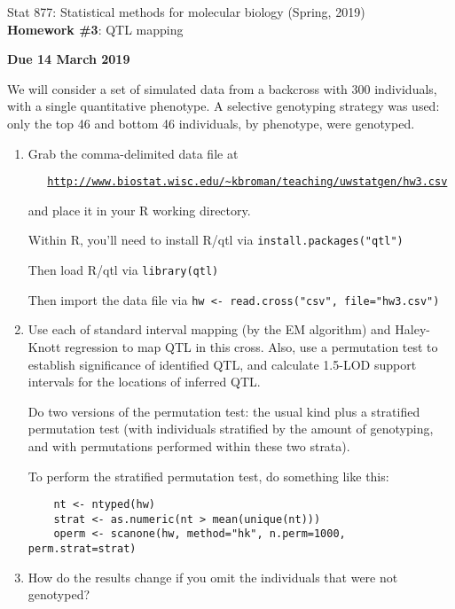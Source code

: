 \documentclass[12pt]{article}
\begin{document}
\thispagestyle{empty}


Stat 877: Statistical methods for molecular biology (Spring, 2019)\\
\textbf{Homework \#3}: QTL mapping

\textbf{Due 14 March 2019}

\bigskip

We will consider a set of simulated data from a backcross with 300 individuals, with a
single quantitative phenotype.  A selective genotyping strategy was
used: only the top 46 and bottom 46 individuals, by phenotype, were
genotyped.

\begin{enumerate}
\item Grab the comma-delimited data file at

{\footnotesize \tt
\verb| | \href{http://www.biostat.wisc.edu/~kbroman/teaching/uwstatgen/hw3.csv}{http://www.biostat.wisc.edu/{\textasciitilde}kbroman/teaching/uwstatgen/hw3.csv}
}

and place it in your R working directory.

Within R, you'll need to install R/qtl via
{\footnotesize \verb|install.packages("qtl")|}

Then load R/qtl via {\footnotesize \verb|library(qtl)|}

Then import the data file via {\footnotesize \verb|hw <- read.cross("csv", file="hw3.csv")|}


\item Use each of standard interval mapping (by the EM algorithm) and
  Haley-Knott regression to map QTL in this cross.  Also, use a
  permutation test to establish significance of identified QTL, and
  calculate 1.5-LOD support intervals for the locations of inferred
  QTL.

Do two versions of the permutation test: the usual kind plus a
stratified permutation test (with individuals stratified by the amount
of genotyping, and with permutations performed within these two strata).

\bigskip
{\footnotesize
To perform the stratified permutation test, do something like this:
\vspace{-12pt}
{\footnotesize
\begin{verbatim}
    nt <- ntyped(hw)
    strat <- as.numeric(nt > mean(unique(nt)))
    operm <- scanone(hw, method="hk", n.perm=1000, perm.strat=strat)
\end{verbatim}
}}

\item How do the results change if you omit the individuals that were
  not genotyped?


\end{enumerate}
\end{document}
